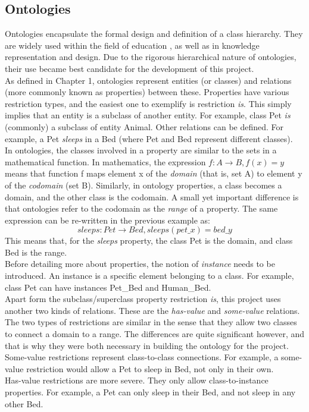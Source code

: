 \documentclass[12pt]{report}
\begin{document}
	\subsection{Ontologies}
    Ontologies encapsulate the formal design and definition of a class hierarchy. They are widely used within the field of education \cite{wikiontology}, as well as in knowledge representation and design. Due to the rigorous hierarchical nature of ontologies, their use became best candidate for the development of this project.\\
    As defined in Chapter 1, ontologies represent entities (or classes) and relations (more commonly known as properties) between these. Properties have various restriction types, and the easiest one to exemplify is restriction \emph{is}. This simply implies that an entity is a subclass of another entity. For example, class Pet \emph{is} (commonly) a subclass of entity Animal. Other relations can be defined. For example, a Pet \emph{sleeps} in a Bed (where Pet and Bed represent different classes).\\
  
    In ontologies, the classes involved in a property are similar to the sets in a mathematical function. In mathematics, the expression \(f: A \rightarrow B, f(x) = y\) means that function f maps element x of the \emph{domain} (that is, set A) to element y of the \emph{codomain} (set B). Similarly, in ontology properties, a class becomes a domain, and the other class is the codomain. A small yet important difference is that ontologies refer to the codomain as the \emph{range} of a property. The same expression can be re-written in the previous example as: \[sleeps: Pet \rightarrow Bed, sleeps(pet\_x) = bed\_y\]
    This means that, for the \emph{sleeps} property, the class Pet is the domain, and class Bed is the range.\\
    Before detailing more about properties, the notion of \emph{instance} needs to be introduced. An instance is a specific element belonging to a class. For example, class Pet can have instances Pet\_Bed and Human\_Bed.
    \\
    Apart form the subclass/superclass property restriction \emph{is}, this project uses another two kinds of relations. These are the \emph{has-value} and \emph{some-value} relations.\\
    The two types of restrictions are similar in the sense that they allow two classes to connect a domain to a range. The differences are quite significant however, and that is why they were both necessary in building the ontology for the project.\\
    Some-value restrictions represent class-to-class connections. For example, a some-value restriction would allow a Pet to sleep in Bed, not only in their own.\\
    Has-value restrictions are more severe. They only allow class-to-instance properties. For example, a Pet can only sleep in their Bed, and not sleep in any other Bed.\\
    
\end{document}
